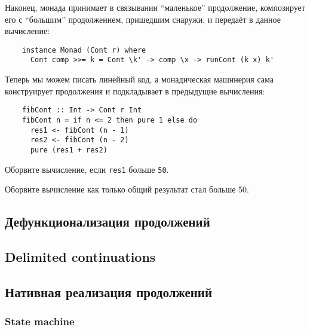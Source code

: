 Наконец, монада принимает в связывании ``маленькое'' продолжение, композирует его с ``большим'' продолжением, пришедшим снаружи, и передаёт в данное вычисление:
\begin{verbatim}
    instance Monad (Cont r) where
      Cont comp >>= k = Cont \k' -> comp \x -> runCont (k x) k'
\end{verbatim}

Теперь мы можем писать линейный код, а монадическая машинерия сама конструирует продолжения и подкладывает в предыдущие вычисления:
\begin{verbatim}
    fibCont :: Int -> Cont r Int
    fibCont n = if n <= 2 then pure 1 else do
      res1 <- fibCont (n - 1)
      res2 <- fibCont (n - 2)
      pure (res1 + res2)
\end{verbatim}

\begin{task}
    Оборвите вычисление, если \texttt{res1} больше \texttt{50}.
\end{task}

\begin{task}
    Оборвите вычисление как только общий результат стал больше 50.
\end{task}


\subsection{Дефункционализация продолжений}

\cite{reynolds1972definitional}




\subsection{Delimited continuations}

\cite{dyvbig2007monadic}




\subsection{Нативная реализация продолжений}

\subsubsection{State machine}

